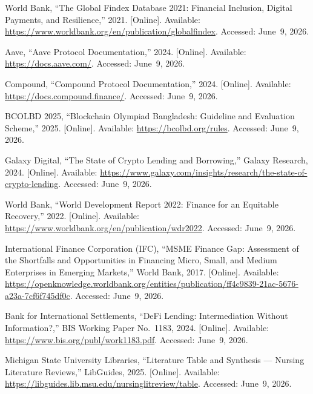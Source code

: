 \documentclass[12pt, a4paper]{report}
\begin{document}
{\begin{enumerate}[label={[\arabic*]}]
\item World Bank, ``The Global Findex Database 2021: Financial Inclusion, Digital Payments, and Resilience,'' 2021. [Online]. Available: \url{https://www.worldbank.org/en/publication/globalfindex}. Accessed: June~9, 2026.

\item Aave, ``Aave Protocol Documentation,'' 2024. [Online]. Available: \url{https://docs.aave.com/}. Accessed: June~9, 2026.

\item Compound, ``Compound Protocol Documentation,'' 2024. [Online]. Available: \url{https://docs.compound.finance/}. Accessed: June~9, 2026.

\item BCOLBD 2025, ``Blockchain Olympiad Bangladesh: Guideline and Evaluation Scheme,'' 2025. [Online]. Available: \url{https://bcolbd.org/rules}. Accessed: June~9, 2026.

\item Galaxy Digital, ``The State of Crypto Lending and Borrowing,'' Galaxy Research, 2024. [Online]. Available: \url{https://www.galaxy.com/insights/research/the-state-of-crypto-lending}. Accessed: June~9, 2026.

\item World Bank, ``World Development Report 2022: Finance for an Equitable Recovery,'' 2022. [Online]. Available: \url{https://www.worldbank.org/en/publication/wdr2022}. Accessed: June~9, 2026.

\item International Finance Corporation (IFC), ``MSME Finance Gap: Assessment of the Shortfalls and Opportunities in Financing Micro, Small, and Medium Enterprises in Emerging Markets,'' World Bank, 2017. [Online]. Available: \url{https://openknowledge.worldbank.org/entities/publication/ff4c9839-21ac-5676-a23a-7cf6f745df0c}. Accessed: June~9, 2026.

\item Bank for International Settlements, ``DeFi Lending: Intermediation Without Information?,'' BIS Working Paper No.~1183, 2024. [Online]. Available: \url{https://www.bis.org/publ/work1183.pdf}. Accessed: June~9, 2026.

\item Michigan State University Libraries, ``Literature Table and Synthesis --- Nursing Literature Reviews,'' LibGuides, 2025. [Online]. Available: \url{https://libguides.lib.msu.edu/nursinglitreview/table}. Accessed: June~9, 2026.


\end{enumerate}}
\end{document}
